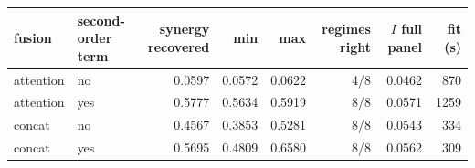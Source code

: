\begin{tabular}{llrrrrrr}
\toprule
\textbf{fusion} & \textbf{second-order term} & \textbf{synergy recovered} & \textbf{min} & \textbf{max} & \textbf{regimes right} & \textbf{$I$ full panel} & \textbf{fit (s)} \\
\midrule
attention & no & 0.0597 & 0.0572 & 0.0622 & 4/8 & 0.0462 & 870 \\
attention & yes & 0.5777 & 0.5634 & 0.5919 & 8/8 & 0.0571 & 1259 \\
concat & no & 0.4567 & 0.3853 & 0.5281 & 8/8 & 0.0543 & 334 \\
concat & yes & 0.5695 & 0.4809 & 0.6580 & 8/8 & 0.0562 & 309 \\
\bottomrule
\end{tabular}

